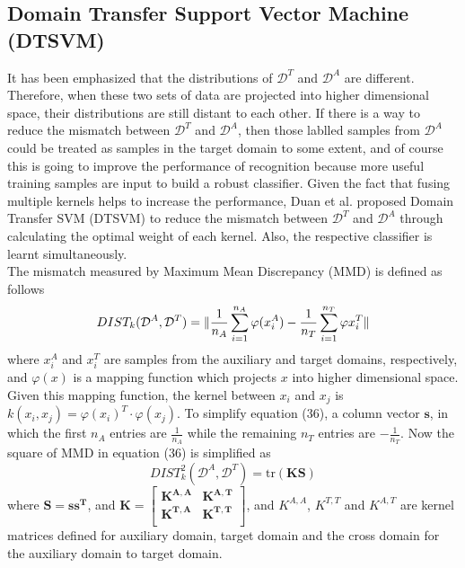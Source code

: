 \subsection{Domain Transfer Support Vector Machine (DTSVM)}
It has been emphasized that the distributions of $\mathcal{D}^T$ and $\mathcal{D}^A$ are different. Therefore, when these two sets of data are projected into higher dimensional space, their distributions are still distant to each other. If there is a way to reduce the mismatch between $\mathcal{D}^T$ and $\mathcal{D}^A$, then those lablled samples from $\mathcal{D}^A$ could be treated as samples in the target domain to some extent, and of course this is going to improve the performance of recognition because more useful training samples are input to build a robust classifier. Given the fact that fusing multiple kernels helps to increase the performance, Duan et al. \cite{duan2009domain} proposed Domain Transfer SVM (DTSVM) to reduce the mismatch between $\mathcal{D}^T$ and $\mathcal{D}^A$ through calculating the optimal weight of each kernel. Also, the respective classifier is learnt simultaneously. \\

\noindent The mismatch measured by Maximum Mean Discrepancy (MMD) \cite{borgwardt2006integrating} is defined as follows
\begin{equation}
DIST_k(\mathcal{D}^A, \mathcal{D}^T) = \lVert \frac{1}{n_A} \sum_{i=1}^{n_A} \varphi(x_i^A) - \frac{1}{n_T} \sum_{i=1}^{n_T} \varphi{x_i^T} \rVert
\end{equation}
where $x_i^A$ and $x_i^T$ are samples from the auxiliary and target domains, respectively, and $\varphi(x)$ is a mapping function which projects $x$ into higher dimensional space. Given this mapping function, the kernel between $x_i$
 and $x_j$ is $k(x_i, x_j) = \varphi (x_i)^T \cdot \varphi (x_j)$. To simplify equation (36), a column vector $\mathbf{s}$, in which the first $n_A$ entries are $\frac{1}{n_A}$ while the remaining $n_T$ entries are $-\frac{1}{n_T}$. Now the square of MMD in equation (36) is simplified as 
\begin{equation}
DIST_k^2(\mathcal{D}^A, \mathcal{D}^T) = \text{tr}(\mathbf{KS})
\end{equation}
where $\mathbf{S = s s^T }$, and $\mathbf{K = \begin{bmatrix} K^{A,A} & K^{A,T} \\ K^{T, A} & K^{T,T}\\  \end{bmatrix}}$, and $K^{A,A}$, $K^{T,T}$ and $K^{A, T}$ are kernel matrices defined for auxiliary domain, target domain and the cross domain for the auxiliary domain to target domain.\\ 

